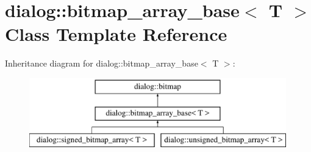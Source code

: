 \hypertarget{classdialog_1_1bitmap__array__base}{}\section{dialog\+:\+:bitmap\+\_\+array\+\_\+base$<$ T $>$ Class Template Reference}
\label{classdialog_1_1bitmap__array__base}
Inheritance diagram for dialog\+:\+:bitmap\+\_\+array\+\_\+base$<$ T $>$\+:\begin{figure}[H]
\begin{center}
\leavevmode
\includegraphics[height=3.000000cm]{classdialog_1_1bitmap__array__base}
\end{center}
\end{figure}
